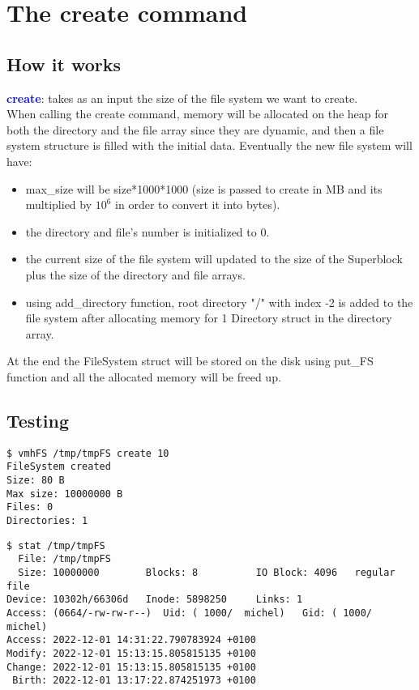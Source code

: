 \section{The create command}

\subsection{How it works}
\textbf{\textcolor{blue}{create}}: takes as an input the size of the file system we want to create.\\

When calling the create command, memory will be allocated on the heap for both the directory and the file array since they are dynamic, and then a file system structure is filled with the initial data. Eventually the new file system will have: 
\begin{itemize}
\item max\_size will be size*1000*1000 (size is passed to create in MB and its multiplied by ${10}^{6}$ in order to convert it into bytes).
\item the directory and file's number is initialized to 0.
\item the current size of the file system will updated to the size of the Superblock plus the size of the directory and file arrays.
\item using add\_directory function, root directory "/" with index -2 is added to the file system after allocating memory for 1 Directory struct in the directory array.
\end{itemize}

At the end the FileSystem struct will be stored on the disk using put\_FS function and all the allocated memory will be freed up.

\newpage
\subsection{Testing}
\begin{lstlisting}
$ vmhFS /tmp/tmpFS create 10
FileSystem created
Size: 80 B
Max size: 10000000 B
Files: 0
Directories: 1
\end{lstlisting}

\begin{lstlisting}
$ stat /tmp/tmpFS 
  File: /tmp/tmpFS
  Size: 10000000        Blocks: 8          IO Block: 4096   regular file
Device: 10302h/66306d   Inode: 5898250     Links: 1
Access: (0664/-rw-rw-r--)  Uid: ( 1000/  michel)   Gid: ( 1000/  michel)
Access: 2022-12-01 14:31:22.790783924 +0100
Modify: 2022-12-01 15:13:15.805815135 +0100
Change: 2022-12-01 15:13:15.805815135 +0100
 Birth: 2022-12-01 13:17:22.874251973 +0100
\end{lstlisting}

\newpage